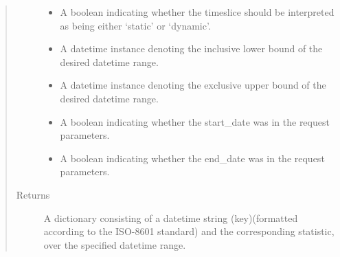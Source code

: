 \documentclass[letterpaper,10pt,english]{sphinxmanual}
\begin{document}
\begin{fulllineitems}
\begin{quote}
\begin{description}
\begin{itemize}
\item {} 
 \textendash{} A boolean indicating whether the timeslice should be interpreted as being either ‘static’ or ‘dynamic’.

\item {} 
 \textendash{} A datetime instance denoting the inclusive lower bound of the desired datetime range.

\item {} 
 \textendash{} A datetime instance denoting the exclusive upper bound of the desired datetime range.

\item {} 
 \textendash{} A boolean indicating whether the start\_date was in the request parameters.

\item {} 
 \textendash{} A boolean indicating whether the end\_date was in the request parameters.

\end{itemize}

\item[{Returns}] \leavevmode
A dictionary consisting of a datetime string (key)(formatted according to the ISO-8601 standard)
and the corresponding statistic, over the specified datetime range.

\end{description}\end{quote}

\end{fulllineitems}

\end{document}

